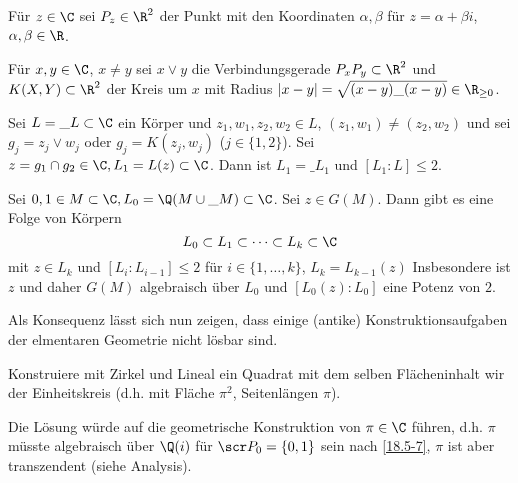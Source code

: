 Für $z \in \C$ sei $P_z \in \R^2$ der Punkt mit den Koordinaten $\alpha, \beta$ für $z = \alpha + \beta i$, $\alpha, \beta \in \R$.

\begin{conv} \label{18.5-5}
	Für $x,y \in \C$, $x \neq y$ sei $x \vee y$ die Verbindungsgerade $P_x P_y \subset \R^2$ und $K(X, Y) \subset \R^2$ der Kreis um $x$ mit Radius $|x-y| = \sqrt{(x-y)\_{(x-y)}} \in \R_{\ge 0}$.
\end{conv}

\begin{st} \label{18.5-6}
	Sei $L = \_L \subset \C$ ein Körper und $z_1, w_1, z_2, w_2 \in L$, $(z_1, w_1) \neq (z_2, w_2)$ und sei $g_j = z_j \vee w_j$ oder $g_j = K(z_j, w_j)$ ($j \in \{1, 2\}$).
	Sei $z = g_1 \cap g_2 \in \C, L_1 = L(z) \subset \C$.
	Dann ist $L_1 = \_{L_1}$ und $[L_1 : L] \le 2$.
\end{st}

\begin{kor} \label{18.5-7}
	Sei $0, 1 \in M \subset \C, L_0 = \Q(M \cup \_{M}) \subset \C$.
	Sei $z \in G(M)$.
	Dann gibt es eine Folge von Körpern
	\[
		L_0 \subset L_1 \subset \dotsb \subset L_k \subset \C
	\]
	mit $z \in L_k$ und $[L_i : L_{i-1}] \le 2$ für $i \in \{1, \dotsc, k\}$, $L_k = L_{k-1}(z)$
	Insbesondere ist $z$ und daher $G(M)$ algebraisch über $L_0$ und $[L_0(z) : L_0]$ eine Potenz von $2$.
\end{kor}

Als Konsequenz lässt sich nun zeigen, dass einige (antike) Konstruktionsaufgaben der elmentaren Geometrie nicht lösbar sind.

\begin{ex} \label{18.5-8}
	Konstruiere mit Zirkel und Lineal ein Quadrat mit dem selben Flächeninhalt wir der Einheitskreis (d.h. mit Fläche $\pi^2$, Seitenlängen $\pi$).

	Die Lösung würde auf die geometrische Konstruktion von $\pi \in \C$ führen, d.h. $\pi$ müsste algebraisch über $\Q(i)$ für $\scr P_0 = \{0, 1\}$ sein nach \ref{18.5-7}, $\pi$ ist aber transzendent (siehe Analysis).
\end{ex}
